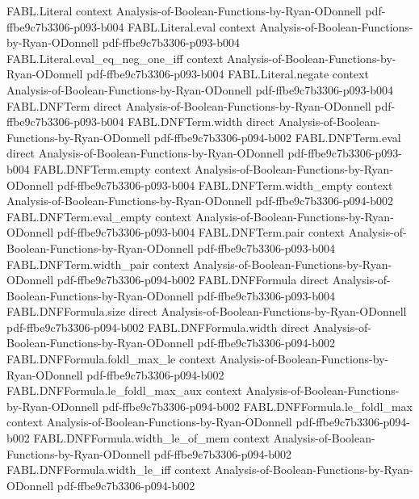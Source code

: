 \begin{theorem}
\proofstep
  {FABL.Literal}
  {context}
  {Analysis-of-Boolean-Functions-by-Ryan-ODonnell}
  {pdf-ffbe9c7b3306-p093-b004}
\proofstep
  {FABL.Literal.eval}
  {context}
  {Analysis-of-Boolean-Functions-by-Ryan-ODonnell}
  {pdf-ffbe9c7b3306-p093-b004}
\proofstep
  {FABL.Literal.eval_eq_neg_one_iff}
  {context}
  {Analysis-of-Boolean-Functions-by-Ryan-ODonnell}
  {pdf-ffbe9c7b3306-p093-b004}
\proofstep
  {FABL.Literal.negate}
  {context}
  {Analysis-of-Boolean-Functions-by-Ryan-ODonnell}
  {pdf-ffbe9c7b3306-p093-b004}
\proofstep
  {FABL.DNFTerm}
  {direct}
  {Analysis-of-Boolean-Functions-by-Ryan-ODonnell}
  {pdf-ffbe9c7b3306-p093-b004}
\proofstep
  {FABL.DNFTerm.width}
  {direct}
  {Analysis-of-Boolean-Functions-by-Ryan-ODonnell}
  {pdf-ffbe9c7b3306-p094-b002}
\proofstep
  {FABL.DNFTerm.eval}
  {direct}
  {Analysis-of-Boolean-Functions-by-Ryan-ODonnell}
  {pdf-ffbe9c7b3306-p093-b004}
\proofstep
  {FABL.DNFTerm.empty}
  {context}
  {Analysis-of-Boolean-Functions-by-Ryan-ODonnell}
  {pdf-ffbe9c7b3306-p093-b004}
\proofstep
  {FABL.DNFTerm.width_empty}
  {context}
  {Analysis-of-Boolean-Functions-by-Ryan-ODonnell}
  {pdf-ffbe9c7b3306-p094-b002}
\proofstep
  {FABL.DNFTerm.eval_empty}
  {context}
  {Analysis-of-Boolean-Functions-by-Ryan-ODonnell}
  {pdf-ffbe9c7b3306-p093-b004}
\proofstep
  {FABL.DNFTerm.pair}
  {context}
  {Analysis-of-Boolean-Functions-by-Ryan-ODonnell}
  {pdf-ffbe9c7b3306-p093-b004}
\proofstep
  {FABL.DNFTerm.width_pair}
  {context}
  {Analysis-of-Boolean-Functions-by-Ryan-ODonnell}
  {pdf-ffbe9c7b3306-p094-b002}
\proofstep
  {FABL.DNFFormula}
  {direct}
  {Analysis-of-Boolean-Functions-by-Ryan-ODonnell}
  {pdf-ffbe9c7b3306-p093-b004}
\proofstep
  {FABL.DNFFormula.size}
  {direct}
  {Analysis-of-Boolean-Functions-by-Ryan-ODonnell}
  {pdf-ffbe9c7b3306-p094-b002}
\proofstep
  {FABL.DNFFormula.width}
  {direct}
  {Analysis-of-Boolean-Functions-by-Ryan-ODonnell}
  {pdf-ffbe9c7b3306-p094-b002}
\proofstep
  {FABL.DNFFormula.foldl_max_le}
  {context}
  {Analysis-of-Boolean-Functions-by-Ryan-ODonnell}
  {pdf-ffbe9c7b3306-p094-b002}
\proofstep
  {FABL.DNFFormula.le_foldl_max_aux}
  {context}
  {Analysis-of-Boolean-Functions-by-Ryan-ODonnell}
  {pdf-ffbe9c7b3306-p094-b002}
\proofstep
  {FABL.DNFFormula.le_foldl_max}
  {context}
  {Analysis-of-Boolean-Functions-by-Ryan-ODonnell}
  {pdf-ffbe9c7b3306-p094-b002}
\proofstep
  {FABL.DNFFormula.width_le_of_mem}
  {context}
  {Analysis-of-Boolean-Functions-by-Ryan-ODonnell}
  {pdf-ffbe9c7b3306-p094-b002}
\proofstep
  {FABL.DNFFormula.width_le_iff}
  {context}
  {Analysis-of-Boolean-Functions-by-Ryan-ODonnell}
  {pdf-ffbe9c7b3306-p094-b002}

\end{theorem}
